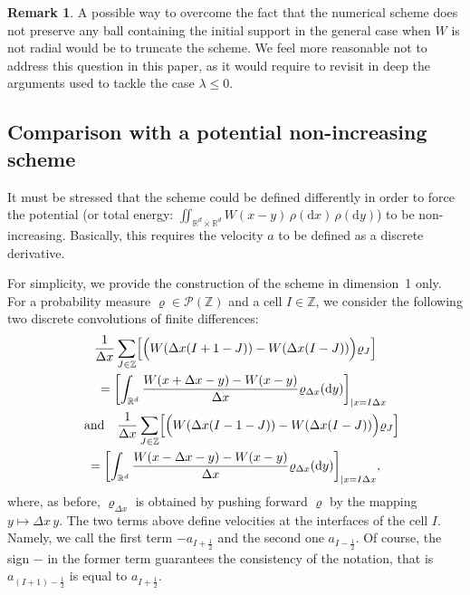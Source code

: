 \documentclass[11pt]{article}
\theoremstyle{definition}
\newtheorem{rema}[theo]{Remark}
\numberwithin{equation}{section}
\newcommand*{\dd}{\mathrm{d}}
\newcommand*{\dx}{\dd x}
\newcommand*{\dy}{\dd y}
\newcommand*\RR{\mathbb{R}}
\newcommand*\ZZ{\mathbb{Z}}
\begin{document}
\begin{rema}
A possible way to overcome the fact that the numerical scheme does not preserve any ball containing the initial support in the general case when $W$ is not radial would be to truncate the scheme. We feel more reasonable not to address this question in this paper, as it would require to revisit in deep the arguments used to tackle the case $\lambda \leq 0$.
\end{rema}


\subsection{Comparison with a potential non-increasing scheme}\label{subse:potential:nonincreasing}

It must be stressed that the scheme could be defined differently in order to force the potential (or total energy: $\iint_{\RR^d \times \RR^d} W(x - y) \, \rho(\dx)\, \rho(\dy)$) to be non-increasing. Basically, this requires the velocity $a$ to be defined as a discrete derivative.

For simplicity, we provide the construction of the scheme in dimension~1 only. For a probability measure $\varrho \in {\mathcal P}(\ZZ)$ and a cell $I \in \ZZ$, we consider the following two discrete convolutions of finite differences:
\begin{multline*}
\frac1{\Delta x}\sum_{J \in \ZZ}
\Bigl[
\Bigl(W(\Delta x (I + 1 - J) ) - W(\Delta x (I - J) )
\Bigr) \varrho_{J}
\Bigr]
\\
\shoveright{= \biggl[\int_{\RR^d} \frac{W(x+\Delta x - y) - W(x-y)}{\Delta x}
\varrho_{\Delta x}(\dy) \biggr]_{\vert x=I \Delta x}}
\\
\shoveleft{\text{and}
\quad \frac1{\Delta x} \sum_{J \in \ZZ}
\Bigl[
\Bigl(W(\Delta x (I -1 - J) ) - W(\Delta x (I - J) )
\Bigr) \varrho_{J}
\Bigr]}
\\
= \biggl[\int_{\RR^d} \frac{W(x-\Delta x - y) - W(x-y)}{\Delta x}
\varrho_{\Delta x}(\dy) \biggr]_{\vert x=I \Delta x},
\end{multline*}
where, as before, $\varrho_{\Delta x}$ is obtained by pushing forward $\varrho$ by the mapping $y \mapsto \Delta x \, y$. The two terms above define velocities at the interfaces of the cell $I$. Namely, we call the first term $-a_{I+\tfrac12}$ and the second one $a_{I-\tfrac12}$. Of course, the sign $-$ in the former term guarantees the consistency of the notation, that is $a_{(I+1)-\tfrac12}$ is equal to $a_{I+\tfrac12}$.
\end{document}
